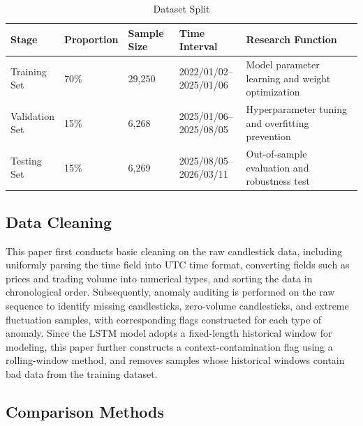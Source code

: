 \documentclass[12pt]{article}
\begin{document}
\begin{table}[htbp]
\centering
\caption{Dataset Split}
\label{tab:dataset_split}
\small
\setlength{\tabcolsep}{4pt}
\renewcommand{\arraystretch}{1.2}
\begin{tabular}{p{}p{}p{}p{}p{}}
\toprule
Stage & Proportion & Sample Size & Time Interval & Research Function \\
\midrule
\makecell{Training\\Set} &
70\% &
29,250 &
\makecell{2022/01/02--\\2025/01/06} &
Model parameter learning and weight optimization \\

\makecell{Validation\\Set} &
15\% &
6,268 &
\makecell{2025/01/06--\\2025/08/05} &
Hyperparameter tuning and overfitting prevention \\

\makecell{Testing\\Set} &
15\% &
6,269 &
\makecell{2025/08/05--\\2026/03/11} &
Out-of-sample evaluation and robustness test \\
\bottomrule
\end{tabular}
\end{table}

\subsection{Data Cleaning}

This paper first conducts basic cleaning on the raw candlestick data, including uniformly 
parsing the time field into UTC time format, converting fields such as prices and trading 
volume into numerical types, and sorting the data in chronological order. Subsequently, 
anomaly auditing is performed on the raw sequence to identify missing candlesticks, 
zero-volume candlesticks, and extreme fluctuation samples, with corresponding flags 
constructed for each type of anomaly. Since the LSTM model adopts a fixed-length historical 
window for modeling, this paper further constructs a context-contamination flag using a 
rolling-window method, and removes samples whose historical windows contain bad data from the 
training dataset.

\subsection{Comparison Methods}
\end{document}
